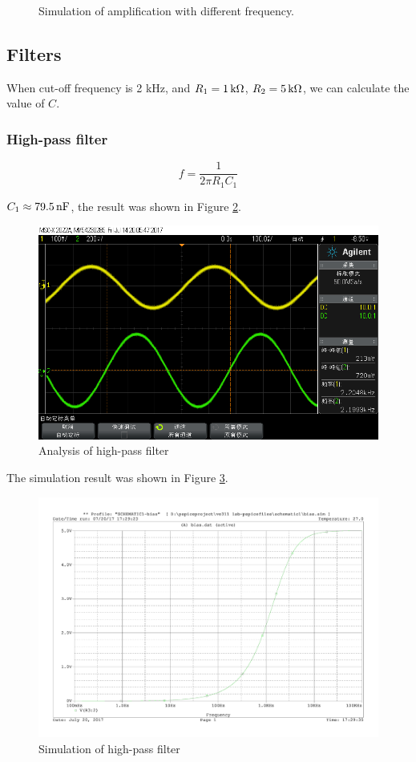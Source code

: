 \documentclass{article}
\newcommand{\unit}[1]{{\rm\,#1}}
\begin{document}
\begin{figure}[htbp]
{		\label{fig-1-3-6}
	}
	\caption{Simulation of amplification with different frequency.}
	\label{fig-1-3}
\end{figure}

\newpage

\subsection{Filters}

When cut-off frequency is 2 kHz, and $R_1=1\unit{k\Omega}$, $R_2=5\unit{k\Omega}$, we can calculate the value of $C$.

\subsubsection{High-pass filter}

$$f=\frac{1}{2\pi R_1C_1}$$

$C_1\approx 79.5\unit{nF}$, the result was shown in Figure \ref{fig-2-1}.

\begin{figure}[htbp]
	\centering
	\includegraphics[width=0.6\linewidth]{imgs/scope_24.png}
	\caption{Analysis of high-pass filter}
	\label{fig-2-1}
\end{figure}

The simulation result was shown in Figure \ref{fig-2-2}.

\begin{figure}[htbp]
	\centering
	\includegraphics[width=0.6\linewidth]{imgs/high.png}
	\caption{Simulation of high-pass filter}
	\label{fig-2-2}
\end{figure}
\end{document}
